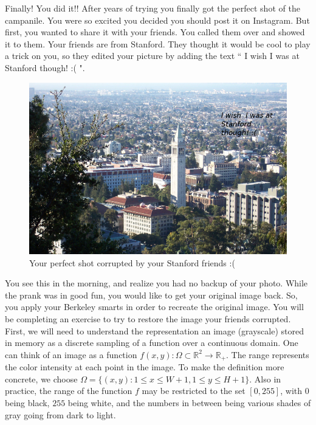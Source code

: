 \newline
\newline
Finally! You did it!! After years of trying you finally got the perfect shot of the campanile. You were so excited you decided you should post it on Instagram. But first, you wanted to share it with your friends. You called them over and showed it to them. Your friends are from Stanford. They thought it would be cool to play a trick on you, so they edited your picture by adding the text `` I wish I was at Stanford though! :( ". 

\begin{figure}[h]
\centering
\includegraphics[scale=2.00]{figures/campanile_img_corrupted.jpg}
\caption{Your perfect shot corrupted by your Stanford friends :(}
\end{figure}
You see this in the morning, and realize you had no backup of your photo. While the prank was in good fun, you would like to get your original image back. So, you apply your Berkeley smarts in order to recreate the original image. You will be completing an exercise to try to restore the image your friends corrupted.
\newline
\newline
First, we will need to understand the representation an image (grayscale) stored in memory as a discrete sampling of a function over a continuous domain. One can think of an image as a function $f(x,y)\colon \Omega \subset  \mathbb{R}^{2}\to \mathbb{R}_{+}$.  The range represents the color intensity at each point in the image.
\newline
\newline
To make the definition more concrete, we choose $\Omega = \{(x,y): 1 \leq x \leq W+1,1 \leq y \leq H+1 \}$. Also in practice, the range of the function $f$ may be restricted to the set $[0,255]$, with $0$ being black, $255$ being white, and the numbers in between being various shades of gray going from dark to light. 

